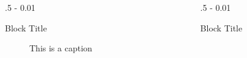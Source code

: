 \documentclass{postertheme}\usepackage[]{graphicx}\usepackage[]{color}
\begin{document}
\begin{frame}
\begin{columns}[onlytextwidth]
\begin{column}{.5 \textwidth - 0.01 \textwidth}
\begin{block}{Block Title}
\begin{figure}
    \vskip0.25in
    \caption{This is a caption}      
  \end{figure}
    
    \end{block}
  \end{column}
  
  \begin{column}{.5 \textwidth - 0.01 \textwidth}
    \begin{block}{Block Title}
    
    \lipsum[7]
    
    \end{block}
  \end{column}
\end{columns}



\end{frame}
\end{document}
